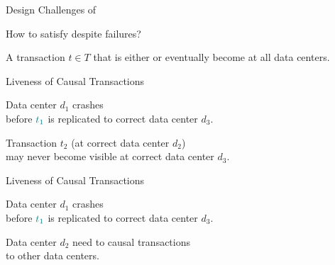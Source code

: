 \begin{frame}{Design Challenges of \unistore}
  \begin{center}
    {How to satisfy  despite failures?}

    \vspace{0.50cm}
    A transaction $t \in T$ that is either 
    or 
    eventually become  at all  data centers.
  \end{center}
\end{frame}

\begin{frame}{Liveness of Causal Transactions}
  \begin{center}
    {Data center $d_{1}$ crashes \\[3pt]
      before $\textcolor{teal}{t_{1}}$ is replicated to correct data center $d_{3}$.}

    \vspace{0.20cm}

    \pause
    Transaction $t_{2}$ (at correct data center $d_{2}$) \\[3pt]
    may never become visible at correct data center $d_{3}$.
  \end{center}
\end{frame}

\begin{frame}{Liveness of Causal Transactions}
  \begin{center}
    Data center $d_{1}$ crashes \\[3pt]
    before $\textcolor{teal}{t_{1}}$ is replicated to correct data center $d_{3}$.

    \vspace{0.20cm}

    \pause
    Data center $d_{2}$ need to  causal transactions \\[3pt]
    to other data centers.
  \end{center}
\end{frame}

